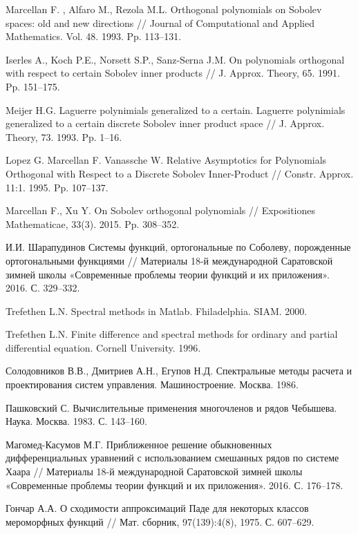 \begin{thebibliography}{111}
{Marcellan F. , Alfaro M., Rezola M.L.} Orthogonal polynomials on Sobolev spaces: old and new directions
// Journal of Computational and Applied Mathematics. Vol. 48. 1993. Pp. 113--131.


{ Iserles A., Koch P.E., Norsett S.P., Sanz-Serna J.M.}
 On polynomials  orthogonal  with respect  to certain Sobolev inner products
// J. Approx. Theory, 65. 1991. Pp. 151--175.


{Meijer H.G.} Laguerre polynimials generalized to a certain.
Laguerre polynimials generalized to a certain discrete Sobolev inner product space
// J. Approx. Theory, 73. 1993. Pp. 1--16.


{Lopez G. Marcellan F. Vanassche W.}
 Relative Asymptotics for Polynomials Orthogonal with Respect to a Discrete Sobolev Inner-Product
// Constr. Approx. 11:1. 1995. Pp. 107--137.


{Marcellan F., Xu Y.}
 On Sobolev orthogonal polynomials
// Expositiones Mathematicae, 33(3). 2015. Pp. 308--352.


И.И. Шарапудинов
 Системы функций, ортогональные по Соболеву, порожденные ортогональными функциями
// Материалы 18-й международной Саратовской зимней школы «Современные проблемы теории функций и их приложения». 2016. С. 329--332.


{Trefethen  L.N.} Spectral methods in Matlab. Fhiladelphia. SIAM. 2000.


{Trefethen  L.N.}
Finite difference and spectral methods for ordinary and partial differential equation. Cornell University. 1996.


{Солодовников В.В., Дмитриев А.Н., Егупов Н.Д.}
Спектральные методы расчета и проектирования систем управления. Машиностроение. Москва. 1986.


{Пашковский С.} Вычислительные применения многочленов и рядов Чебышева. Наука. Москва. 1983. С. 143--160.


{Магомед-Касумов М.Г.}
 Приближенное решение обыкновенных дифференциальных уравнений с использованием смешанных рядов по системе Хаара
// Материалы 18-й международной Саратовской зимней школы «Современные проблемы теории функций и их приложения». 2016. С. 176--178.


{Гончар А.А.}
 О сходимости аппроксимаций Паде для некоторых классов мероморфных функций
// Мат. сборник, 97(139):4(8), 1975. С. 607--629.



\end{thebibliography}
